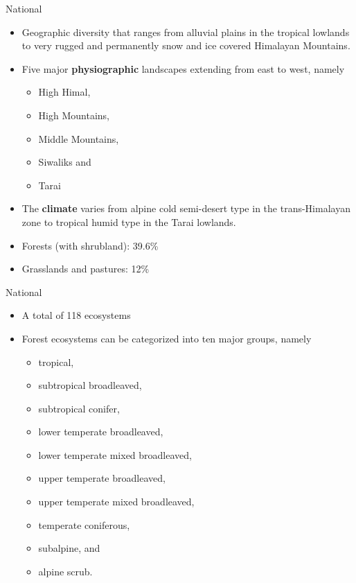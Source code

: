 \documentclass[
  ignorenonframetext,
  aspectratio=169]{beamer}
\providecommand{\tightlist}{%
  \setlength{\itemsep}{0pt}\setlength{\parskip}{0pt}}
\begin{document}
\begin{frame}{National}
\protect\hypertarget{national}{}
\begin{itemize}
\tightlist
\item
  Geographic diversity that ranges from alluvial plains in the tropical
  lowlands to very rugged and permanently snow and ice covered Himalayan
  Mountains.
\item
  Five major \textbf{physiographic} landscapes extending from east to
  west, namely

  \begin{itemize}
  \tightlist
  \item
    High Himal,
  \item
    High Mountains,
  \item
    Middle Mountains,
  \item
    Siwaliks and
  \item
    Tarai
  \end{itemize}
\item
  The \textbf{climate} varies from alpine cold semi-desert type in the
  trans-Himalayan zone to tropical humid type in the Tarai lowlands.
\item
  Forests (with shrubland): 39.6\%
\item
  Grasslands and pastures: 12\%
\end{itemize}
\end{frame}

\begin{frame}{National}
\protect\hypertarget{national-1}{}
\begin{itemize}
\tightlist
\item
  A total of 118 ecosystems
\item
  Forest ecosystems can be categorized into ten major groups, namely

  \begin{itemize}
  \tightlist
  \item
    tropical,
  \item
    subtropical broadleaved,
  \item
    subtropical conifer,
  \item
    lower temperate broadleaved,
  \item
    lower temperate mixed broadleaved,
  \item
    upper temperate broadleaved,
  \item
    upper temperate mixed broadleaved,
  \item
    temperate coniferous,
  \item
    subalpine, and
  \item
    alpine scrub.
  \end{itemize}
\end{itemize}
\end{frame}
\end{document}
